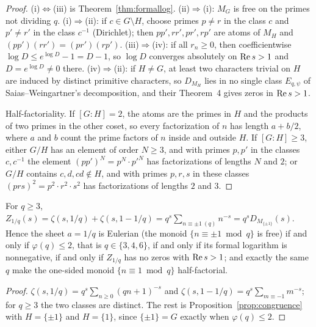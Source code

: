 \begin{proof}
(i)$\Leftrightarrow$(iii) is Theorem~\ref{thm:formallog}. (ii)$\Rightarrow$(i): $M_G$ is free on the primes not dividing $q$.
(i)$\Rightarrow$(ii): if $c\in G\setminus H$, choose primes $p\ne r$ in the class $c$ and $p'\ne r'$ in the class $c^{-1}$ (Dirichlet); then $pp',rr',pr',rp'$ are atoms of $M_H$ and $(pp')(rr')=(pr')(rp')$.
(iii)$\Rightarrow$(iv): if all $r_n\ge0$, then coefficientwise $\log D\le e^{\log D}-1=D-1$, so $\log D$ converges absolutely on $\operatorname{Re} s>1$ and $D=e^{\log D}\ne0$ there.
(iv)$\Rightarrow$(ii): if $H\ne G$, at least two characters trivial on $H$ are induced by distinct primitive characters, so $D_{M_H}$ lies in no single class $E_{q,\psi}$ of Saias--Weingartner's decomposition, and their Theorem~4 gives zeros in $\operatorname{Re} s>1$.

Half-factoriality. If $[G:H]=2$, the atoms are the primes in $H$ and the products of two primes in the other coset, so every factorization of $n$ has length $a+b/2$, where $a$ and $b$ count the prime factors of $n$ inside and outside $H$. If $[G:H]\ge3$, either $G/H$ has an element of order $N\ge3$, and with primes $p,p'$ in the classes $c,c^{-1}$ the element $(pp')^N=p^N\cdot p'^N$ has factorizations of lengths $N$ and $2$; or $G/H$ contains $c,d,cd\notin H$, and with primes $p,r,s$ in these classes $(prs)^2=p^2\cdot r^2\cdot s^2$ has factorizations of lengths $2$ and $3$.
\end{proof}

\begin{proposition}[the even sheets at $a=1/q$]\label{prop:evensheets}
For $q\ge3$, $Z_{1/q}(s)=\zeta(s,1/q)+\zeta(s,1-1/q)=q^s\sum_{n\equiv\pm1\ (q)}n^{-s}=q^sD_{M_{\{\pm1\}}}(s)$.
Hence the sheet $a=1/q$ is Eulerian (the monoid $\{n\equiv\pm1\bmod q\}$ is free) if and only if $\varphi(q)\le2$, that is $q\in\{3,4,6\}$, if and only if its formal logarithm is nonnegative, if and only if $Z_{1/q}$ has no zeros with $\operatorname{Re} s>1$; and exactly the same $q$ make the one-sided monoid $\{n\equiv1\bmod q\}$ half-factorial.
\end{proposition}

\begin{proof}
$\zeta(s,1/q)=q^s\sum_{n\ge0}(qn+1)^{-s}$ and $\zeta(s,1-1/q)=q^s\sum_{m\equiv-1}m^{-s}$; for $q\ge3$ the two classes are distinct. The rest is Proposition~\ref{prop:congruence} with $H=\{\pm1\}$ and $H=\{1\}$, since $\{\pm1\}=G$ exactly when $\varphi(q)\le2$.
\end{proof}

